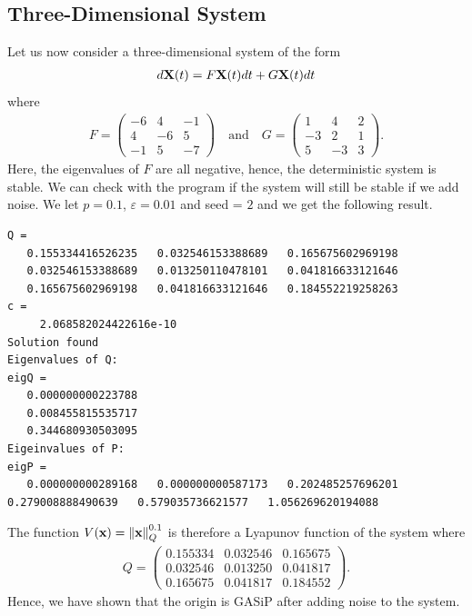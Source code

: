 \documentclass[a4paper,12pt,twoside,BCOR=10mm]{scrbook}
\begin{document}
\subsection{Three-Dimensional System}\label{Kafli 3 dimensional system}
Let us now consider a three-dimensional system of the form
\begin{align*}
    d\mathbf{X}(t) = F\mathbf{X}(t)dt + G\mathbf{X}(t)dt
\end{align*}
where
\begin{align*}
    F = \begin{pmatrix}
    -6 & 4 & -1\\
    4 & -6 & 5\\
    -1 & 5 & -7
    \end{pmatrix}
    \quad \text{and} \quad
    G = \begin{pmatrix}
    1 & 4 & 2\\
    -3 & 2 & 1\\
    5 & -3 & 3
    \end{pmatrix}.
\end{align*}
Here, the eigenvalues of $F$ are all negative, hence, the deterministic system is stable. We can check with the program if the system will still be stable if we add noise. We let $p = 0.1$, $\varepsilon = 0.01$ and seed = $2$ and we get the following result.
\begin{lstlisting}
Q =
   0.155334416526235   0.032546153388689   0.165675602969198
   0.032546153388689   0.013250110478101   0.041816633121646
   0.165675602969198   0.041816633121646   0.184552219258263
c =
     2.068582024422616e-10
Solution found
Eigenvalues of Q:
eigQ =
   0.000000000223788
   0.008455815535717
   0.344680930503095
Eigeinvalues of P:
eigP =
   0.000000000289168   0.000000000587173   0.202485257696201   0.279008888490639   0.579035736621577   1.056269620194088
\end{lstlisting}
The function $V(\mathbf{x}) = \left\lVert\mathbf{x}\right\rVert_{Q}^{0.1}$ is therefore a Lyapunov function of the system where
\begin{align*}
    Q = \begin{pmatrix}
    0.155334 & 0.032546 & 0.165675\\
    0.032546 & 0.013250 & 0.041817\\
    0.165675 & 0.041817 & 0.184552
    \end{pmatrix}.
\end{align*}
Hence, we have shown that the origin is GASiP after adding noise to the system.
\end{document}
